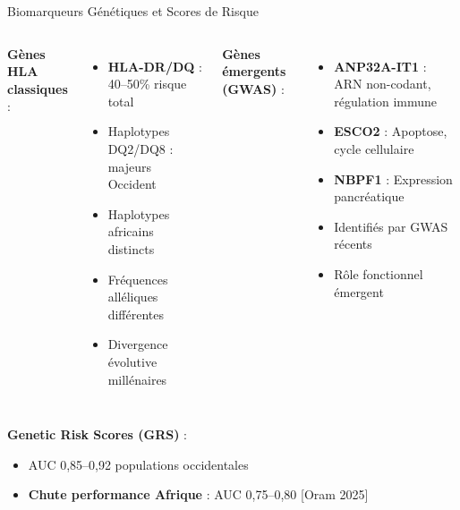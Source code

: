 \documentclass[11pt, aspectratio=169]{beamer}
\begin{document}
\begin{frame}{Biomarqueurs Génétiques et Scores de Risque}
  \begin{columns}[T]
    \textbf{\color{accent2} Gènes HLA classiques} :
    \begin{itemize}
      \item \textbf{HLA-DR/DQ} : 40--50\% risque total
      \item Haplotypes DQ2/DQ8 : majeurs Occident
      \item Haplotypes africains distincts
      \item Fréquences alléliques différentes
      \item Divergence évolutive millénaires
    \end{itemize}
    
    \textbf{\color{accent1} Gènes émergents (GWAS)} :
    \begin{itemize}
      \item \textbf{ANP32A-IT1} : ARN non-codant, régulation immune
      \item \textbf{ESCO2} : Apoptose, cycle cellulaire
      \item \textbf{NBPF1} : Expression pancréatique
      \item Identifiés par GWAS récents
      \item Rôle fonctionnel émergent
    \end{itemize}
  \end{columns}
  
  \vspace{1em}
  
  \textbf{\color{accent2} Genetic Risk Scores (GRS)} :
  \begin{itemize}
    \item AUC 0,85--0,92 populations occidentales
    \item \textbf{\textcolor{accent1}{Chute performance Afrique}} : AUC 0,75--0,80 [Oram 2025]
  \end{itemize}
\end{frame}
\end{document}
